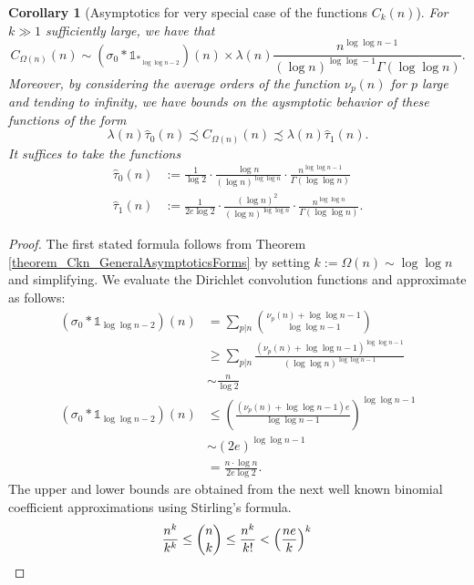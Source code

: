 \documentclass[11pt,reqno,a4letter]{article}
\numberwithin{figure}{section}
\numberwithin{table}{section}
\theoremstyle{plain}
\newtheorem{cor}[theorem]{Corollary}
\numberwithin{theorem}{section}
\theoremstyle{definition}
\begin{document}
\begin{cor}[Asymptotics for very special case of the functions $C_k(n)$] 
\label{cor_Asymptotics_KeyCases_Of_Ckn_v1} 
For $k \gg 1$ sufficiently large, we have that 
\[
C_{\Omega(n)}(n) \sim (\sigma_0 \ast \mathds{1}_{\ast_{\log\log n-2}})(n) \times \lambda(n) 
     \frac{n^{\log\log n -1}}{(\log n)^{\log\log -1} \Gamma(\log\log n)}. 
\]
Moreover, by considering the average orders of the function $\nu_p(n)$ for $p$ large and 
tending to infinity, we have bounds on the aysmptotic behavior of these functions 
of the form 
\[
\lambda(n)\widehat{\tau}_0(n) \precsim C_{\Omega(n)}(n) \precsim \lambda(n)\widehat{\tau}_1(n). 
\]
It suffices to take the functions 
\begin{align*} 
\widehat{\tau}_0(n) & := \frac{1}{\log 2} \cdot \frac{\log n}{(\log n)^{\log\log n}} \cdot 
     \frac{n^{\log\log n-1}}{\Gamma(\log\log n)} \\ 
\widehat{\tau}_1(n) & := \frac{1}{2e \log 2} \cdot \frac{(\log n)^2}{(\log n)^{\log\log n}} \cdot 
     \frac{n^{\log\log n}}{\Gamma(\log\log n)}. 
\end{align*} 
\end{cor} 
\begin{proof} 
The first stated formula follows from 
Theorem \ref{theorem_Ckn_GeneralAsymptoticsForms} by setting 
$k := \Omega(n) \sim \log\log n$ and simplifying. We evaluate the Dirichlet convolution 
functions and approximate as follows: 
\begin{align*} 
(\sigma_0 \ast \mathds{1}_{\log\log n-2})(n) & = \sum_{p|n} \binom{\nu_p(n) + \log\log n-1}{\log\log n-1} \\ 
     & \geq \sum_{p|n} \frac{(\nu_p(n) + \log\log n-1)^{\log\log n-1}}{(\log\log n)^{\log\log n-1}} \\ 
     & \sim \frac{n}{\log 2} \\ 
(\sigma_0 \ast \mathds{1}_{\log\log n-2})(n) & \leq \left(
     \frac{(\nu_p(n) + \log\log n-1)e}{\log\log n-1} 
     \right)^{\log\log n -1} \\ 
     & \sim (2e)^{\log\log n-1} \\ 
     & = \frac{n \cdot \log n}{2e \log 2}.    
\end{align*} 
The upper and lower bounds are obtained from the next well known binomial coefficient approximations 
using Stirling's formula. 
\[
\frac{n^k}{k^k} \leq \binom{n}{k} \leq \frac{n^k}{k!} < \left(\frac{ne}{k}\right)^k 
     \qedhere 
\]
\end{proof} 
\end{document}
